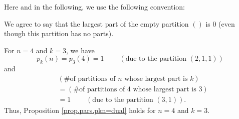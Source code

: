 Here and in the following, we use the following convention:

\begin{convention}
\label{conv.pars.largest-part-0}We agree to say that the largest part of the
empty partition $\left(  {}\right)  $ is $0$ (even though this partition has
no parts).
\end{convention}

\begin{example}
For $n=4$ and $k=3$, we have%
\[
p_{k}\left(  n\right)  =p_{3}\left(  4\right)  =1\ \ \ \ \ \ \ \ \ \ \left(
\text{due to the partition }\left(  2,1,1\right)  \right)
\]
and%
\begin{align*}
&  \left(  \text{\# of partitions of }n\text{ whose largest part is }k\right)
\\
&  =\left(  \text{\# of partitions of }4\text{ whose largest part is }3\right)
\\
&  =1\ \ \ \ \ \ \ \ \ \ \left(  \text{due to the partition }\left(
3,1\right)  \right)  .
\end{align*}
Thus, Proposition \ref{prop.pars.pkn=dual} holds for $n=4$ and $k=3$.
\end{example}

